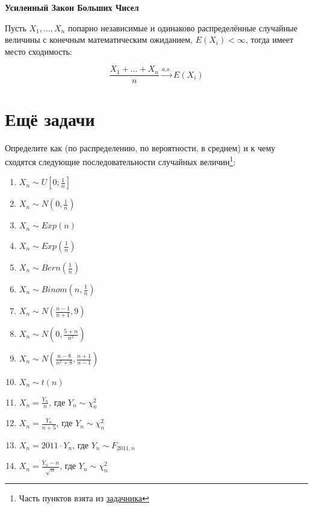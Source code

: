 \documentclass[12pt, a4paper, oneside]{article}
\begin{document}
\begin{theorem}{\textbf{Усиленный Закон Больших Чисел}}

Пусть $X_1, \ldots, X_n$ попарно независимые и одинаково распределённые случайные величины с конечным математическим ожиданием, $E(X_i) < \infty$, тогда имеет место сходимость:

$$
\frac{X_1 + \ldots + X_n}{n} \overset{a.s.}{\to} E(X_i)
$$
\end{theorem}



\section{Ещё задачи}

\begin{problem}{ }
Определите как (по распределению, по вероятности, в среднем) и к чему сходятся следующие последовательности случайных величин\footnote{Часть пунктов взята из \href{https://github.com/bdemeshev/probability_pro}{задачника}}: 

\begin{multicols}{2}
\begin{enumerate} 
\item $X_n \sim U\left[0 ; \frac{1}{n} \right]$
\item $X_n \sim N\left(0, \frac{1}{n}\right)$ 
\item $X_n \sim Exp(n)$
\item $X_n \sim Exp\left(\frac{1}{n} \right)$
\item $X_n \sim Bern\left(\frac{1}{n}\right)$
\item $X_n \sim Binom(n, \frac{1}{n})$
\item $X_n \sim N\left(\frac{n-1}{n+1}, 9\right)$
\item $X_n \sim N\left(0, \frac{5 + n}{n^2}\right)$
\item $X_n \sim N \left(\frac{n-8}{n^2 + 8}, \frac{n+1}{n-1} \right)$
\item $X_n \sim t(n)$
\item $X_n = \frac{Y_n}{n}$, где $Y_n \sim \chi^2_n$
\item $X_n = \frac{Y_n}{n+5}$, где $Y_n \sim \chi^2_n$
\item $X_n = 2011 \cdot  Y_n$, где $Y_n \sim F_{2011,n}$
\item $X_n = \frac{Y_n - n}{\sqrt{n}}$, где $Y_n \sim \chi^2_n$
\end{enumerate}
\end{multicols}
\end{problem}
\end{document}
